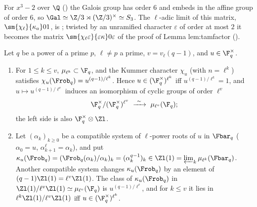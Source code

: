 For $x^3-2$ over $\Q$ () the Galois group has order $6$ and embeds in the affine group of order $6$, so
$\Gal\simeq\Z/3\rtimes(\Z/3)^\times\simeq S_3$. The $\ell$-adic limit of this matrix, $\sm{\chi_\ell}{\kappa_a}01$, is ; twisted by an
unramified character $\varepsilon$ of order at most $2$ it becomes the matrix $\sm{\chi_\ell\varepsilon}{\varepsilon\kappa}0\varepsilon$ of the proof of Lemma lem:tamfactor
().

\begin{proposition}\label{prop:galois:kummer-finite-field}
Let $q$ be a power of a prime $p$, $\ell\ne p$ a prime, $v=v_\ell(q-1)$, and $u\in\F_q^\times$.
\begin{enumerate}[label=(\alph*)]
\item For $1\le k\le v$, $\mu_{\ell^k}\subset\F_q$, and the Kummer character $\chi_u$ (with $n=\ell^k$) satisfies $\chi_u(\Frob_q)=u^{(q-1)/\ell^k}$. Hence
$u\in(\F_q^\times)^{\ell^k}$ iff $u^{(q-1)/\ell^k}=1$, and $u\mapsto u^{(q-1)/\ell^v}$ induces an isomorphism of cyclic groups of order $\ell^v$
\[
\F_q^\times/(\F_q^\times)^{\ell^v}\ \xrightarrow{\ \sim\ }\ \mu_{\ell^v}(\F_q);
\]
the left side is also $\F_q^\times\otimes\Zl$.
\item Let $(\alpha_k)_{k\ge0}$ be a compatible system of $\ell$-power roots of $u$ in $\Fbar_q$ ($\alpha_0=u$, $\alpha_{k+1}^\ell=\alpha_k$), and put
$\kappa_u(\Frob_q)=(\Frob_q(\alpha_k)/\alpha_k)_k=(\alpha_k^{q-1})_k\in\Zl(1)=\varprojlim_k\mu_{\ell^k}(\Fbar_q)$. Another compatible system changes $\kappa_u(\Frob_q)$ by an
element of $(q-1)\Zl(1)=\ell^v\Zl(1)$. The class of $\kappa_u(\Frob_q)$ in $\Zl(1)/\ell^v\Zl(1)\simeq\mu_{\ell^v}(\F_q)$ is $u^{(q-1)/\ell^v}$, and for $k\le v$ it lies in
$\ell^k\Zl(1)/\ell^v\Zl(1)$ iff $u\in(\F_q^\times)^{\ell^k}$.
\end{enumerate}
\end{proposition}

